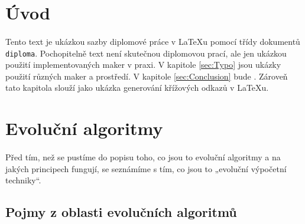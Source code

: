 \documentclass[bc,male,java,dept460]{diploma}		%
\begin{document}
\MakeTitlePages

\tableofcontents
\cleardoublepage	%

\listoftables
\cleardoublepage	%

\listoffigures
\cleardoublepage	%

\lstlistoflistings
\cleardoublepage	%

\section{Úvod}
\label{sec:Uvod}
\paragraph*{}
Tento text je ukázkou sazby diplomové práce v \LaTeX{}u pomocí třídy dokumentů \verb|diploma|.
Pochopitelně text není skutečnou diplomovou prací, ale jen ukázkou použití
implementovaných maker v praxi. V kapitole \ref{sec:Typo} jsou ukázky použití
různých maker a prostředí. V kapitole \ref{sec:Conclusion} bude . Zároveň tato kapitola slouží jako ukázka generování křížových odkazů v \LaTeX{}u.

\section{Evoluční algoritmy}
\paragraph*{}
Před tím, než se pustíme do popisu toho, co jsou to evoluční algoritmy a na jakých principech fungují, se seznámíme s tím, co jsou to „evoluční výpočetní techniky“.



\subsection{Pojmy z oblasti evolučních algoritmů}
\end{document}
